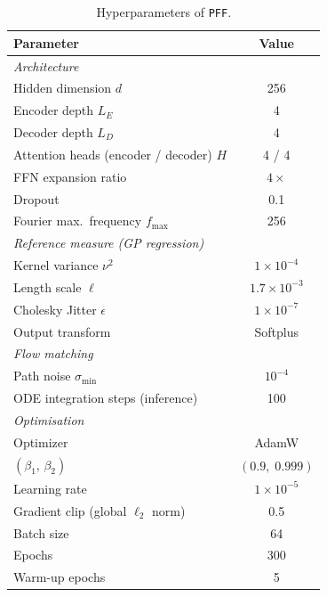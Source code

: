 \begin{table}[h]
\centering
\caption{Hyperparameters of \texttt{PFF}.}
\label{tab:hyperparams}
\begin{tabular}{lc}
\toprule
\textbf{Parameter} & \textbf{Value} \\
\midrule
\multicolumn{2}{l}{\textit{Architecture}} \\
Hidden dimension $d$                        & 256 \\
Encoder depth $L_E$                         & 4   \\
Decoder depth $L_D$                         & 4   \\
Attention heads (encoder / decoder) $H$     & 4 / 4 \\
FFN expansion ratio                         & $4\times$ \\
Dropout                                     & 0.1 \\
Fourier max.\ frequency $f_{\max}$          & 256 \\
\midrule
\multicolumn{2}{l}{\textit{Reference measure (GP regression)}} \\
Kernel variance $\nu^2$                     & $1\!\times\!10^{-4}$ \\
Length scale $\ell$                         & $1.7\!\times\!10^{-3}$ \\
Cholesky Jitter $\epsilon$                           & $1\!\times\!10^{-7}$ \\
Output transform                            & Softplus \\
\midrule
\multicolumn{2}{l}{\textit{Flow matching}} \\
Path noise $\sigma_{\min}$                  & $10^{-4}$ \\
ODE integration steps (inference)           & 100 \\
\midrule
\multicolumn{2}{l}{\textit{Optimisation}} \\
Optimizer                                   & AdamW \\
$(\beta_1,\,\beta_2)$                       & $(0.9,\;0.999)$ \\
Learning rate                               & $1\!\times\!10^{-5}$ \\
Gradient clip (global $\ell_2$ norm)        & 0.5 \\
Batch size                                  & 64 \\
Epochs                                      & 300 \\
Warm-up epochs                              & 5 \\
\bottomrule
\end{tabular}
\end{table}







